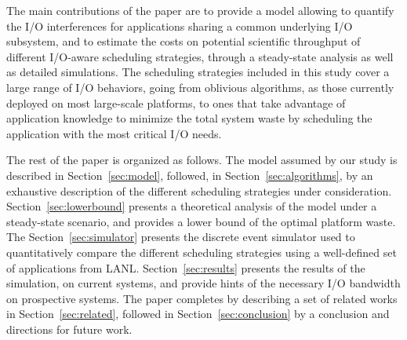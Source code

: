 The main contributions of the paper are to provide a model allowing to quantify
the I/O interferences for applications sharing a common underlying I/O
subsystem, and to estimate the costs on potential scientific throughput of different I/O-aware
scheduling strategies, through
a steady-state analysis as well as detailed simulations.
The scheduling strategies included in this study cover a
large range of I/O behaviors, going from oblivious algorithms, as those
currently deployed on most large-scale platforms, to ones that take advantage of
application knowledge to minimize the total system waste by scheduling the
application with the most critical I/O needs.

The rest of the paper is organized as follows. The model assumed by our study is
described in  Section~\ref{sec:model}, followed, in
Section~\ref{sec:algorithms}, by an exhaustive description of the different
scheduling strategies under consideration. Section~\ref{sec:lowerbound}
presents a theoretical analysis of the model under a steady-state scenario, and
provides a lower bound of the optimal platform waste. The
Section~\ref{sec:simulator} presents the discrete event simulator used to
quantitatively compare the different scheduling strategies using a well-defined
set of applications from LANL. Section~\ref{sec:results} presents the results of
the simulation, on current systems, and provide hints of the necessary I/O
bandwidth on prospective systems. The paper completes by describing a set of
related works in Section~\ref{sec:related}, followed in
Section~\ref{sec:conclusion} by a conclusion and directions for future work.


